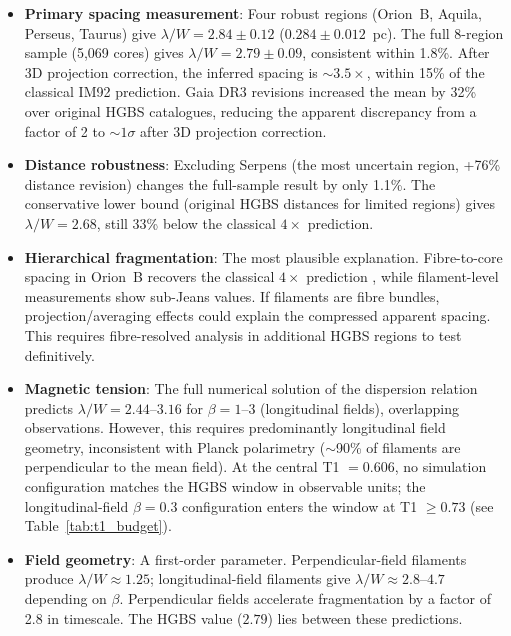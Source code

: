\documentclass[twoside,twocolumn]{mnras}
\begin{document}
\begin{itemize}

    \item \textbf{Primary spacing measurement}: Four robust regions (Orion~B, Aquila,
    Perseus, Taurus) give $\lambda/W = 2.84 \pm 0.12$ ($0.284 \pm 0.012$~pc). The
    full 8-region sample (5,069 cores) gives $\lambda/W = 2.79 \pm 0.09$, consistent
    within 1.8\%. After 3D projection correction, the inferred spacing is ${\sim}3.5\times$,
    within 15\% of the classical IM92 prediction. Gaia DR3 revisions increased the mean
    by 32\% over original HGBS catalogues, reducing the apparent discrepancy from a factor of 2 to ${\sim}1\sigma$ after 3D projection correction.

    \item \textbf{Distance robustness}: Excluding Serpens (the most uncertain region,
    +76\% distance revision) changes the full-sample result by only 1.1\%.
    The conservative lower bound (original HGBS distances for limited regions) gives
    $\lambda/W = 2.68$, still 33\% below the classical $4\times$ prediction.

    \item \textbf{Hierarchical fragmentation}: The most plausible explanation.
    Fibre-to-core spacing in Orion~B recovers the classical $4\times$ prediction
    \citep{Yang2024}, while filament-level measurements show sub-Jeans values.
    If filaments are fibre bundles, projection/averaging effects could explain the
    compressed apparent spacing. This requires fibre-resolved analysis in additional
    HGBS regions to test definitively.

    \item \textbf{Magnetic tension}: The full numerical solution of the dispersion
    relation predicts $\lambda/W = 2.44$--$3.16$ for $\beta = 1$--$3$ (longitudinal
    fields), overlapping observations. However, this requires predominantly longitudinal
    field geometry, inconsistent with Planck polarimetry ($\sim$90\% of filaments
    are perpendicular to the mean field). At the central T1 $= 0.606$, no simulation
    configuration matches the HGBS window in observable units; the longitudinal-field
    $\beta = 0.3$ configuration enters the window at T1 $\geq 0.73$ (see Table~\ref{tab:t1_budget}).

    \item \textbf{Field geometry}: A first-order parameter. Perpendicular-field
    filaments produce $\lambda/W \approx 1.25$; longitudinal-field filaments give
    $\lambda/W \approx 2.8$--$4.7$ depending on $\beta$. Perpendicular fields accelerate
    fragmentation by a factor of 2.8 in timescale. The HGBS value ($2.79$) lies between
    these predictions.


\end{itemize}
\end{document}
